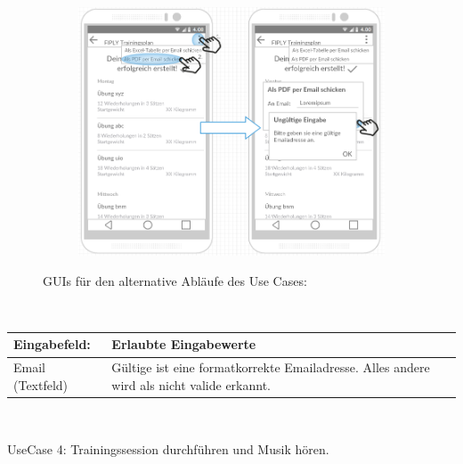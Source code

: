 \documentclass[FIPLY_base.tex]{subfiles}
\begin{document}
	\begin{figure}[h]
		\begin{subfigure}[b]{0.3\textwidth}
			\includegraphics[scale=0.32]{img/TrainingsplanexportierenungueltigeEingabe}
		\end{subfigure}
		\caption{GUIs für  den alternative Abläufe des Use Cases:}
	\end{figure}
	\ \\
	\begin{center}
		\def\arraystretch{1.3}%
		\begin{tabular}{| p{5cm} | p{5cm} |}
			\hline
			\textbf{Eingabefeld:} & \textbf{Erlaubte Eingabewerte} \\ \hline 
			Email (Textfeld) & Gültige ist eine formatkorrekte Emailadresse. Alles andere wird als nicht valide erkannt. \\ \hline
		\end{tabular} \\
	\end{center}
	\newpage
	UseCase 4: Trainingssession durchführen und Musik hören.
	\ \\
\end{document}
